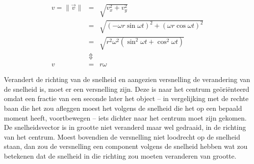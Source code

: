 \documentclass{ximera}
\begin{document}
\begin{eqnarray}
	v=\parallel\vec{v}\parallel&=&\sqrt{v_x^2+v_y^2}\nonumber\\
	&=&\sqrt{(-\omega r\sin\omega t)^2+(\omega r\cos\omega t)^2}\nonumber\\
	&=&\sqrt{r^2\omega^2(\sin^2\omega t+\cos^2\omega t)}\nonumber\\
	&\Updownarrow&\nonumber\\
	v&=&r\omega\label{snelheid}
\end{eqnarray}

 Verandert de richting van de snelheid en aangezien versnelling de verandering van de snelheid is, moet er een versnelling zijn. 
 Deze is naar het centrum ge\"ori\"enteerd omdat een fractie van een seconde later het object -- in vergelijking met de rechte baan die het zou afleggen moest het volgens de snelheid die het op een bepaald moment heeft, voortbewegen -- iets dichter naar het centrum moet zijn gekomen. 
 De snelheidsvector is in grootte niet veranderd maar wel gedraaid, in de richting van het centrum. 
 Moest bovendien de versnelling niet loodrecht op de snelheid staan, dan zou de versnelling een component volgens de snelheid hebben wat zou betekenen dat de snelheid in die richting zou moeten veranderen van grootte.





	
    
    
    
    

        
        
\end{document}

